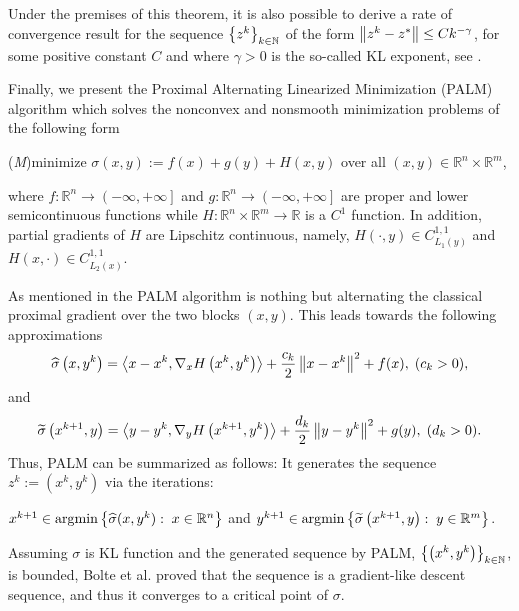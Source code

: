 \begin{remark}
Under the premises of this theorem, it is also possible to derive a rate of convergence result for the sequence $\left\lbrace z^k \right\rbrace_{k \in \mathbb{N}}$ of the form $\left\Vert {z^k - z^{*}} \right\Vert \leq Ck^{-\gamma}$, for some positive constant $C$ and where $\gamma>0$ is the so-called KL exponent, see \cite{BST2014}.
\end{remark}

Finally, we present the Proximal Alternating Linearized Minimization (PALM) algorithm which solves the nonconvex and nonsmooth minimization problems of the following form
\begin{center}
(\textit{M})\quad minimize $\sigma(x,y):=f(x)+g(y)+H(x,y)$ over all $(x,y) \in \mathbb{R}^n \times \mathbb{R}^m$,
\end{center}
where $f:\mathbb{R}^n \rightarrow \left(-\infty,+\infty\right]$ and $g:\mathbb{R}^n \rightarrow \left(-\infty,+\infty\right]$ are proper and lower semicontinuous functions while $H:\mathbb{R}^n \times \mathbb{R}^m \rightarrow \mathbb{R}$ is a $C^1$ function. In addition, partial gradients of $H$ are Lipschitz continuous, namely, $H(\cdot, y) \in C^{1,1}_{L_1(y)}$ and $H(x,\cdot) \in C^{1,1}_{L_2(x)}$.\medskip

As mentioned in \cite{BST2014} the PALM algorithm is nothing but alternating the classical proximal gradient over the two blocks $(x,y)$. This leads towards the following approximations 
\begin{equation*}
	\widehat{\sigma}\left(x,y^k\right) = \left\langle x-x^k, \nabla_x H\left( x^k, y^k \right)\right\rangle + \frac{c_k}{2}\left\Vert {x-x^k} \right\Vert^2 + f(x), \; (c_k>0),
\end{equation*}
and
\begin{equation*}
	\widetilde{\sigma}\left(x^{k+1},y\right) = \left\langle y-y^k, \nabla_y H\left( x^{k+1}, y^k \right)\right\rangle + \frac{d_k}{2}\left\Vert {y-y^k} \right\Vert^2 + g(y), \; (d_k>0).
\end{equation*}
Thus, PALM can be summarized as follows: It generates the sequence $z^k:=\left(x^k,y^k\right)$ via the iterations:
\begin{center}
$x^{k+1} \in \arg\!\min \left\lbrace \widehat{\sigma}(x,y^k) : \; x \in \mathbb{R}^n \right\rbrace$ \quad and \quad $y^{k+1} \in \arg\!\min \left\lbrace \widetilde{\sigma}\left(x^{k+1},y\right) : \; y \in \mathbb{R}^m \right\rbrace$.
\end{center}
Assuming $\sigma$ is KL function and the generated sequence by PALM, $\left\lbrace \left( x^k, y^k\right)\right\rbrace_{k \in \mathbb{N}}$, is bounded, Bolte et al. \cite{BST2014} proved that the sequence is a gradient-like descent sequence, and thus it converges to a critical point of $\sigma$. 
